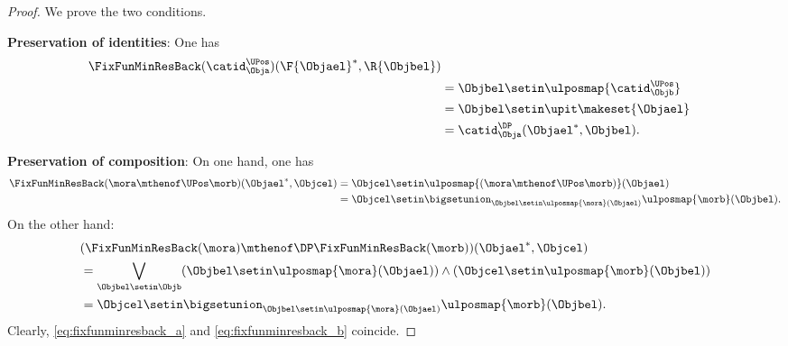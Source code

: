 \begin{proof}
    We prove the two conditions.

    \textbf{Preservation of identities}:
    One has
    \begin{equation*}
        \begin{aligned}
            \FixFunMinResBack(\catid_{\Obja}^{\UPos})(\F{\Objael}^*,\R{\Objbel}) \\
             & =
            \Objbel \setin \ulposmap{\catid_{\Objb}^{\UPos}} \\
             & =\Objbel \setin \upit \makeset{ \Objael} \\
             & =\catid_{\Obja}^{\DP}(\Objael^*,\Objbel).
        \end{aligned}
    \end{equation*}

    \textbf{Preservation of composition}:
    On one hand, one has
    \begin{equation}
        \label{eq:fixfunminresback_a}
        \begin{aligned}
            \FixFunMinResBack(\mora\mthenof\UPos \morb)(\Objael^*,\Objcel) & =
            \Objcel \setin \ulposmap{(\mora \mthenof\UPos \morb)}(\Objael) \\
                                                                           & =\Objcel \setin \bigsetunion_{\Objbel\setin \ulposmap{\mora}(\Objael)}\ulposmap{\morb}(\Objbel).
        \end{aligned}
    \end{equation}
    On the other hand:
    \begin{equation}
        \label{eq:fixfunminresback_b}
        \begin{aligned}
             & (\FixFunMinResBack(\mora)\mthenof\DP \FixFunMinResBack(\morb))(\Objael^*,\Objcel) \\
             & =
            \bigvee_{\Objbel \setin \Objb}(\Objbel \setin \ulposmap{\mora}(\Objael))\wedge (\Objcel\setin \ulposmap{\morb}(\Objbel)) \\
             & =\Objcel \setin \bigsetunion_{\Objbel\setin \ulposmap{\mora}(\Objael)}\ulposmap{\morb}(\Objbel).
        \end{aligned}
    \end{equation}
    Clearly, \cref{eq:fixfunminresback_a} and \cref{eq:fixfunminresback_b} coincide.
\end{proof}

